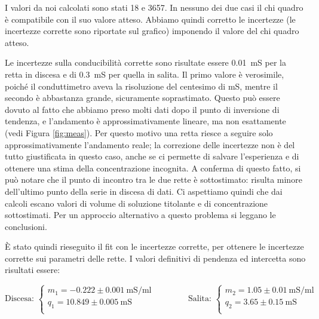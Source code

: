 I valori da noi calcolati sono stati 18 e 3657. In nessuno dei due casi il chi quadro è compatibile con il suo valore atteso.
Abbiamo quindi corretto le incertezze (le incertezze corrette sono riportate sul grafico) imponendo il valore del chi quadro
atteso. 

Le incertezze sulla conducibilità corrette sono risultate essere \SI{0.01}{\milli\siemens} per la retta in discesa e di
\SI{0.3}{\milli\siemens} per quella in salita. Il primo valore è verosimile, poiché il conduttimetro aveva la risoluzione del centesimo di mS, mentre
il secondo è abbastanza grande, sicuramente soprastimato. Questo può essere dovuto al fatto che abbiamo preso molti dati dopo il punto di inversione di tendenza,
e l'andamento è approssimativamente lineare, ma non esattamente (vedi Figura \ref{fig:meas}). Per questo motivo una retta riesce a seguire solo approssimativamente
l'andamento reale; la correzione delle incertezze non è del tutto giustificata in questo caso, anche se ci permette di salvare l'esperienza e di ottenere una stima
della concentrazione incognita. A conferma di questo fatto, si può notare che il punto di incontro tra le due rette è sottostimato: risulta minore dell'ultimo punto della serie
in discesa di dati. Ci aspettiamo quindi che dai calcoli escano valori di volume di soluzione titolante e di concentrazione sottostimati.
Per un approccio alternativo a questo problema si leggano le conclusioni.

È stato quindi rieseguito il fit con le incertezze corrette, per ottenere le incertezze corrette sui parametri delle rette.
I valori definitivi di pendenza ed intercetta sono risultati essere:

\begin{equation*}
    \text{Discesa: }
    \left\{    
    \begin{array}{l}
        m_1 = -0.222 \pm 0.001 ~ \si{\milli\siemens\per\milli\litre} \\
        q_1 = 10.849 \pm 0.005 ~ \si{\milli\siemens} \\
    \end{array}
    \right.
    \qquad
    \qquad
    \text{Salita: }
    \left\{    
        \begin{array}{l}
        m_2 = 1.05 \pm 0.01 ~ \si{\milli\siemens\per\milli\litre} \\
        q_2 = 3.65 \pm 0.15 ~ \si{\milli\siemens} \\
    \end{array}
    \right.
\end{equation*}

